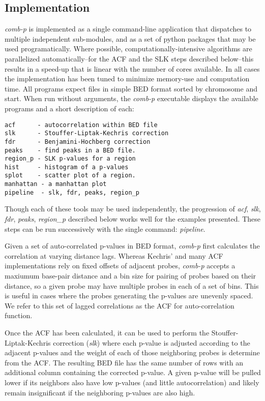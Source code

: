 \documentclass{bioinfo}
\begin{document}
\begin{methods}

\section{Implementation}

\textit{comb-p} is implemented as a single command-line application that
dispatches to multiple independent sub-modules, and as a set of python
packages that may be used programatically. Where possible,
computationally-intensive algorithms are parallelized
automatically--for the ACF and the SLK steps described below--this
results in a speed-up that is linear with the number of cores available.
In all cases the implementation has been tuned to minimize memory-use and
computation time. All programs expect files in simple BED format \citep{Kent2002}
sorted by chromosome and start.
When run without arguments, the \textit{comb-p} executable displays the
available programs and a short description of each:
\begin{verbatim}
acf      - autocorrelation within BED file
slk      - Stouffer-Liptak-Kechris correction
fdr      - Benjamini-Hochberg correction
peaks    - find peaks in a BED file.
region_p - SLK p-values for a region
hist     - histogram of a p-values
splot    - scatter plot of a region.
manhattan - a manhattan plot
pipeline  - slk, fdr, peaks, region_p
\end{verbatim}
Though each of these tools may be used independently, the progression of
\textit{acf}, \textit{slk}, \textit{fdr}, \textit{peaks}, \textit{region\_p}
described below works well for the examples presented. These steps can
be run successively with the single command: \textit{pipeline}.

Given a set of auto-correlated p-values in BED format, \textit{comb-p} first
calculates the correlation at varying distance lags. Whereas Kechris' \citep{Kechris2010}
and many ACF implementations rely on fixed offsets of adjacent probes,
\textit{comb-p} accepts a maxiumum base-pair distance and a bin size
for pairing of probes based on their distance, so a given probe may
have multiple probes in each of a set of bins. This is useful in cases
where the probes generating the p-values are unevenly spaced. We refer
to this set of lagged correlations as the ACF for auto-correlation
function.

Once the ACF has been calculated, it can be used to perform the
Stouffer-Liptak-Kechris correction (\textit{slk}) where each p-value is
adjusted according to the adjacent p-values and the weight of each of
those neighboring probes is determine from the ACF. The resulting BED file
has the same number of rows with an additional column containing the corrected
p-value. A given p-value will be pulled lower if its neighbors also have low
p-values (and little autocorrelation) and likely remain insignificant if the
neighboring p-values are also high.


\end{methods}
\end{document}

